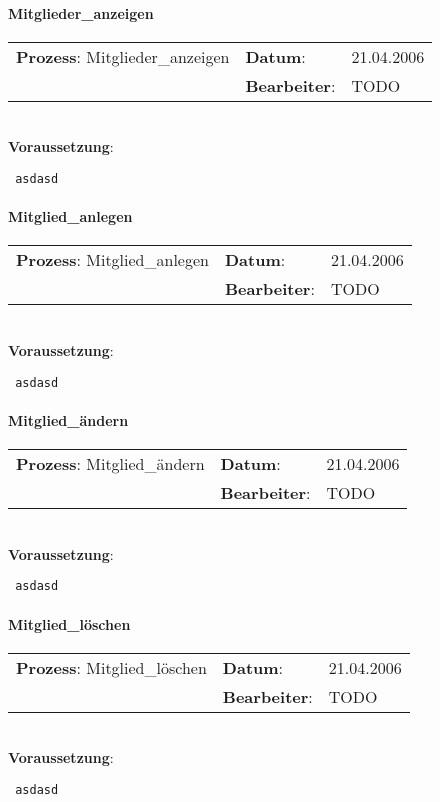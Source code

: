 \paragraph{Mitglieder\_anzeigen}
\begin{tabular}[t]{p{9.5cm}ll}
\textbf{Prozess}: Mitglieder\_anzeigen 	&\textbf{Datum}:      &21.04.2006\\
					&\textbf{Bearbeiter}: &TODO\\
\end{tabular}

\hrulefill\\
\textbf{Voraussetzung}:
\begin{verbatim}
 asdasd
\end{verbatim}
\hrulefill

\paragraph{Mitglied\_anlegen}
\begin{tabular}[t]{p{9.5cm}ll}
\textbf{Prozess}: Mitglied\_anlegen  	&\textbf{Datum}:      &21.04.2006\\
					&\textbf{Bearbeiter}: &TODO\\
\end{tabular}

\hrulefill\\
\textbf{Voraussetzung}:
\begin{verbatim}
 asdasd
\end{verbatim}
\hrulefill



\paragraph{Mitglied\_ändern}
\begin{tabular}[t]{p{9.5cm}ll}
\textbf{Prozess}: Mitglied\_ändern  	&\textbf{Datum}:      &21.04.2006\\
					&\textbf{Bearbeiter}: &TODO\\
\end{tabular}

\hrulefill\\
\textbf{Voraussetzung}:
\begin{verbatim}
 asdasd
\end{verbatim}
\hrulefill



\paragraph{Mitglied\_löschen}
\begin{tabular}[t]{p{9.5cm}ll}
\textbf{Prozess}: Mitglied\_löschen  	&\textbf{Datum}:      &21.04.2006\\
					&\textbf{Bearbeiter}: &TODO\\
\end{tabular}

\hrulefill\\
\textbf{Voraussetzung}:
\begin{verbatim}
 asdasd
\end{verbatim}
\hrulefill